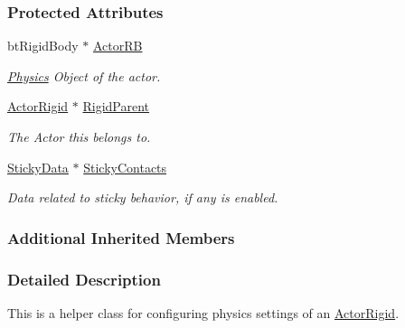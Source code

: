 \subsubsection*{Protected Attributes}
\begin{DoxyCompactItemize}
\item 
bt\-Rigid\-Body $\ast$ \hyperlink{classMezzanine_1_1ActorRigidPhysicsSettings_a6b8383d096105187418886ac0f28daf3}{Actor\-R\-B}
\begin{DoxyCompactList}\small\item\em \hyperlink{namespaceMezzanine_1_1Physics}{Physics} Object of the actor. \end{DoxyCompactList}\item 
\hypertarget{classMezzanine_1_1ActorRigidPhysicsSettings_ac83840161a9a88ecdcbacfa3c204bd6e}{\hyperlink{classMezzanine_1_1ActorRigid}{Actor\-Rigid} $\ast$ \hyperlink{classMezzanine_1_1ActorRigidPhysicsSettings_ac83840161a9a88ecdcbacfa3c204bd6e}{Rigid\-Parent}}\label{classMezzanine_1_1ActorRigidPhysicsSettings_ac83840161a9a88ecdcbacfa3c204bd6e}

\begin{DoxyCompactList}\small\item\em The Actor this belongs to. \end{DoxyCompactList}\item 
\hypertarget{classMezzanine_1_1ActorRigidPhysicsSettings_a8ddca7ae371cae162657763543f970bb}{\hyperlink{structMezzanine_1_1StickyData}{Sticky\-Data} $\ast$ \hyperlink{classMezzanine_1_1ActorRigidPhysicsSettings_a8ddca7ae371cae162657763543f970bb}{Sticky\-Contacts}}\label{classMezzanine_1_1ActorRigidPhysicsSettings_a8ddca7ae371cae162657763543f970bb}

\begin{DoxyCompactList}\small\item\em Data related to sticky behavior, if any is enabled. \end{DoxyCompactList}\end{DoxyCompactItemize}
\subsubsection*{Additional Inherited Members}


\subsubsection{Detailed Description}
This is a helper class for configuring physics settings of an \hyperlink{classMezzanine_1_1ActorRigid}{Actor\-Rigid}. 

